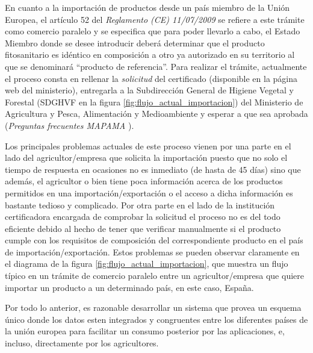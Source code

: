 \par
En cuanto a la importación de productos desde un país miembro de la Unión Europea, el artículo 52 del \textit{Reglamento (CE) 11/07/2009} \cite{reglamento} se refiere a este trámite como comercio paralelo y se especifica que para poder llevarlo a cabo, el Estado Miembro donde se desee introducir deberá determinar que el producto fitosanitario es idéntico en composición a otro ya autorizado en su territorio al que se denominará “producto de referencia”. Para realizar el trámite, actualmente el proceso consta en rellenar la \textit{solicitud} del \gls{certificado} \cite{solicitud} (disponible en la página web del ministerio), entregarla a la Subdirección General de Higiene Vegetal y Forestal (SDGHVF en la figura \ref{fig:flujo_actual_importacion}) del Ministerio de Agricultura y Pesca, Alimentación y Medioambiente y esperar a que sea aprobada (\textit{Preguntas frecuentes MAPAMA} \cite{faqmapama}). 

\par
Los principales problemas actuales de este proceso vienen por una parte en el lado del agricultor/empresa que solicita la importación puesto que no solo el tiempo de respuesta en ocasiones no es inmediato (de hasta de 45 días) sino que además, el agricultor o bien tiene poca información acerca de los productos permitidos en una importación/exportación o el acceso a dicha información es bastante tedioso y complicado. Por otra parte en el lado de la institución certificadora encargada de comprobar la solicitud el proceso no es del todo eficiente debido al hecho de tener que verificar manualmente si el producto cumple con los requisitos de composición del correspondiente producto en el país de importación/exportación. Estos problemas se pueden observar claramente en el diagrama de la figura \ref{fig:flujo_actual_importacion}, que muestra un flujo típico en un trámite de comercio paralelo entre un agricultor/empresa que quiere importar un producto a un determinado país, en este caso, España. 

\par
Por todo lo anterior, es razonable desarrollar un sistema que provea un esquema único donde los datos esten integrados y congruentes entre los diferentes países de la unión europea para facilitar un consumo posterior por las aplicaciones, e, incluso, directamente por los agricultores. 

